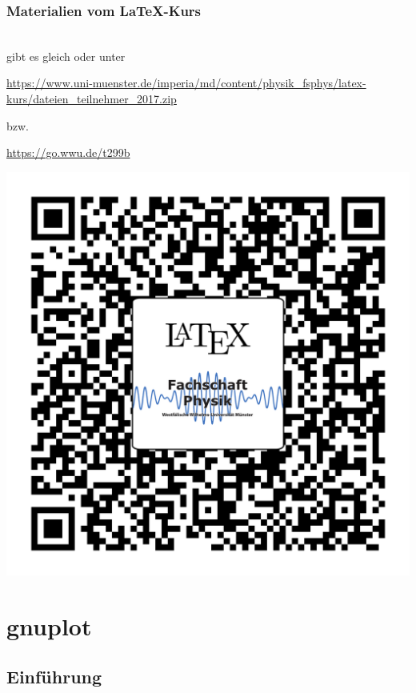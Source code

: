 \begin{frame}[<+->]
	\frametitle{Materialien vom \LaTeX-Kurs}
	
	\centering
	\large
	\\
	gibt es gleich oder unter
	
	\url{https://www.uni-muenster.de/imperia/md/content/physik_fsphys/latex-kurs/dateien_teilnehmer_2017.zip}
	
	bzw.\
	
	\url{https://go.wwu.de/t299b}
	
	\vspace{-1ex}
	\includegraphics[height=0.6\textheight]{res/qrcode_dateien.pdf}
\end{frame}

\section{gnuplot}
\subsection{Einführung}

